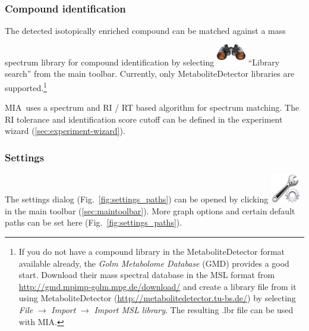 \documentclass[a4paper,12pt]{scrartcl}
\newcommand*\app{\textsc{MIA}}
\begin{document}
\subsubsection{Compound identification}
\label{sec:identification}

The detected isotopically enriched compound can be matched against a mass spectrum library for compound identification by selecting \includegraphics{gfx/edit-find.png} ``Library search'' from the main toolbar. Currently, only MetaboliteDetector \citep{Hiller2009} libraries are supported.\footnote{If you do not have a compound library in the MetaboliteDetector format available already, the \textit{Golm Metabolome Database} (GMD) \cite{Hummel2013} provides a good start. Download their mass spectral database in the MSL format from \url{http://gmd.mpimp-golm.mpg.de/download/} and create a library file from it using MetaboliteDetector (\url{http://metabolitedetector.tu-bs.de/}) by selecting \textit{File} $\rightarrow$ \textit{Import} $\rightarrow$ \textit{Import MSL library}. The resulting .lbr file can be used with \app.}

\app\ uses a spectrum and RI / RT based algorithm for spectrum matching. The RI tolerance and identification score cutoff can be defined in the experiment wizard (\ref{sec:experiment-wizard}).


\subsubsection{Settings}

\label{sec:settings}

The settings dialog (Fig.~\ref{fig:settings_paths}) can be opened by clicking \includegraphics{gfx/ico_settings.png} in the main toolbar (\ref{sec:maintoolbar}).
More graph options and certain default paths can be set here (Fig.~\ref{fig:settings_paths}).
\end{document}
